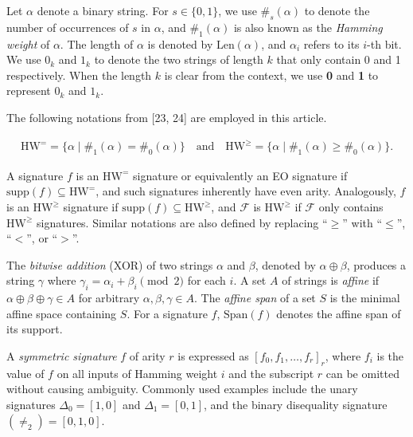 \documentclass[10pt,a4paper]{article}
\begin{document}
Let $\alpha$ denote a binary string. For $s\in\{0,1\}$, we use $\#_{s}(\alpha)$ to denote the number of occurrences of $s$ in $\alpha$, and $\#_{1}(\alpha)$ is also known as the \emph{Hamming weight} of $\alpha$. The length of $\alpha$ is denoted by $\text{Len}(\alpha)$, and $\alpha_{i}$ refers to its $i$-th bit. We use $0_{k}$ and $1_{k}$ to denote the two strings of length $k$ that only contain 0 and 1 respectively. When the length $k$ is clear from the context, we use \textbf{0} and \textbf{1} to represent $0_{k}$ and $1_{k}$.\par




The following notations from [23, 24] are employed in this article.\par


\[\begin{gathered}
\text{HW}^{=}=\{\alpha\mid\#_{1}(\alpha)=\#_{0}(\alpha)\}\quad\text{and}\quad\text{HW}^{\geq}=\{\alpha\mid\#_{1}(\alpha)\geq\#_{0}(\alpha)\}.
\end{gathered}\]


A signature $f$ is an $\text{HW}^{=}$ signature or equivalently an EO signature if $\text{supp}(f)\subseteq\text{HW}^{=}$, and such signatures inherently have even arity. Analogously, $f$ is an $\text{HW}^{\geq}$ signature if $\text{supp}(f)\subseteq\text{HW}^{\geq}$, and $\mathcal{F}$ is $\text{HW}^{\geq}$ if $\mathcal{F}$ only contains $\text{HW}^{\geq}$ signatures. Similar notations are also defined by replacing “$\geq$” with “$\leq$”, “$<$”, or “$>$”.\par




The \emph{bitwise addition} (XOR) of two strings $\alpha$ and $\beta$, denoted by $\alpha\oplus\beta$, produces a string $\gamma$ where $\gamma_{i}=\alpha_{i}+\beta_{i}\pmod{2}$ for each $i$. A set $A$ of strings is \emph{affine} if $\alpha\oplus\beta\oplus\gamma\in A$ for arbitrary $\alpha,\beta,\gamma\in A$. The \emph{affine span} of a set $S$ is the minimal affine space containing $S$. For a signature $f$, $\text{Span}(f)$ denotes the affine span of its support.\par




A \emph{symmetric signature} $f$ of arity $r$ is expressed as $[f_{0},f_{1},\ldots,f_{r}]_{r}$, where $f_{i}$ is the value of $f$ on all inputs of Hamming weight $i$ and the subscript $r$ can be omitted without causing ambiguity.
Commonly used examples include the unary signatures $\Delta_{0}=[1,0]$ and $\Delta_{1}=[0,1]$, and the binary disequality signature $(\neq_{2})=[0,1,0]$.\par
\end{document}
